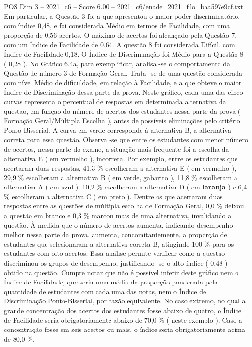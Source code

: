 \begin{textsample}{POS Dim 3 – 2021\_c6 – Score 6.00 – 2021\_c6/enade\_2021\_filo\_baa597e9cf.txt}
Em particular, a Questão 3 foi a que apresentou o maior poder discriminatório, com índice 0,48, e foi considerada Médio em termos de Facilidade, com uma proporção de 0,56 acertos.
O máximo de acertos foi alcançado pela Questão 7, com um Índice de Facilidade de 0,64.
A questão 8 foi considerada Difícil, com Índice de Facilidade 0,18.
O Índice de Discriminação foi Médio para a Questão 8 ( 0,28 ).
No Gráfico 6.4a, para exemplificar, analisa -se o comportamento da Questão de número 3 de Formação Geral.
Trata -se de uma questão considerada com nível Médio de dificuldade, em relação à Facilidade, e a que obteve o maior Índice de Discriminação dessa parte da prova.
Neste gráfico, cada uma das cinco curvas representa o percentual de respostas em determinada alternativa da questão, em função do número de acertos dos estudantes nessa parte da prova ( Formação Geral/Múltipla Escolha ), antes de possíveis eliminações pelo critério Ponto-Bisserial.
A curva em verde corresponde à alternativa B, a alternativa correta para essa questão.
Observa -se que entre os estudantes com menor número de acertos, nessa parte do exame, a situação mais frequente foi a escolha da alternativa E ( em vermelho ), incorreta.
Por exemplo, entre os estudantes que acertaram duas respostas, 41,3 \% escolheram a alternativa E ( em vermelho ), 29,9 \% escolheram a alternativa B ( em verde, gabarito ), 11,8 \% escolheram a alternativa A ( em azul ), 10,2 \% escolheram a alternativa D ( em \textbf{laranja} ) e 6,4 \% escolheram a alternativa C ( em preto ).
Dentre os que acertaram duas respostas entre as questões de múltipla escolha de Formação Geral, 0,0 \% deixou a questão em branco e 0,3 \% marcou mais de uma alternativa, invalidando a questão.
À medida que o número de acertos aumenta, indicando desempenho melhor nessa parte da prova, aumenta, concomitantemente, a proporção de estudantes que selecionaram a alternativa correta B, atingindo 100 \% para os estudantes com oito acertos.
Essa análise permite verificar como a questão discriminou os grupos de desempenho, justificando -se o alto índice ( 0,48 ) obtido na questão.
Cumpre notar que não é possível inferir deste gráfico nem o Índice de Facilidade, que seria uma média da proporção ponderada pela quantidade de estudantes com cada uma das notas, nem o Índice de Discriminação Ponto-Bisserial, por razão equivalente.
No caso extremo, no qual a grande concentração dos acertos dos estudantes fosse abaixo de quatro, o Índice de Facilidade seria obrigatoriamente abaixo de 70,0 \% ( neste exemplo ).
Caso a concentração fosse em seis acertos ou mais, o índice seria obrigatoriamente acima de 80,0 \%.

\end{textsample}

